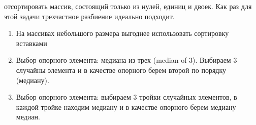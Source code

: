  отсортировать массив, состоящий только из нулей, единиц и двоек. Как раз для этой задачи трехчастное разбиение идеально подходит.


\begin{enumerate}
    \item На массивах небольшого размера выгоднее использовать сортировку вставками
    \item Выбор опорного элемента: медиана из трех (median-of-3). Выбираем 3 случайны элемента и в качестве опорного берем второй по порядку (медиану).
    \item Выбор опорного элемента: выбираем 3 тройки случайных элементов, в
    каждой тройке находим медиану и в качестве опорного берем медиану медиан.
\end{enumerate}
